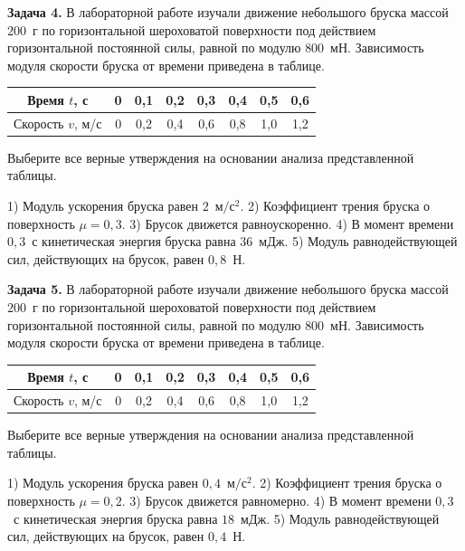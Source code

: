 \begin{taskbasic}[code={\label{task:newton2_v3_n5}}]
\textbf{Задача 4.} В лабораторной работе изучали движение небольшого бруска массой $200$~г по горизонтальной шероховатой поверхности под действием горизонтальной постоянной силы, равной по модулю $800$~мН. Зависимость модуля скорости бруска от времени приведена в таблице.
\begin{center}
\begin{tabular}{|c|c|c|c|c|c|c|c|}
\hline
Время $t$, с & 0 & 0,1 & 0,2 & 0,3 & 0,4 & 0,5 & 0,6 \\ \hline
Скорость $v$, м/с & 0 & 0,2 & 0,4 & 0,6 & 0,8 & 1,0 & 1,2 \\ \hline
\end{tabular}
\end{center}
Выберите все верные утверждения на основании анализа представленной таблицы.

1) Модуль ускорения бруска равен $2$~$м/с^2$.
2) Коэффициент трения бруска о поверхность $\mu = 0{,}3$.
3) Брусок движется равноускоренно.
4) В момент времени $0{,}3$~с кинетическая энергия бруска равна $36$~мДж.
5) Модуль равнодействующей сил, действующих на брусок, равен $0{,}8$~Н.

\end{taskbasic}

\begin{taskbasic}[code={\label{task:newton2_v4_n5}}]
\textbf{Задача 5.} В лабораторной работе изучали движение небольшого бруска массой $200$~г по горизонтальной шероховатой поверхности под действием горизонтальной постоянной силы, равной по модулю $800$~мН. Зависимость модуля скорости бруска от времени приведена в таблице.
\begin{center}
\begin{tabular}{|c|c|c|c|c|c|c|c|}
\hline
Время $t$, с & 0 & 0,1 & 0,2 & 0,3 & 0,4 & 0,5 & 0,6 \\ \hline
Скорость $v$, м/с & 0 & 0,2 & 0,4 & 0,6 & 0,8 & 1,0 & 1,2 \\ \hline
\end{tabular}
\end{center}
Выберите все верные утверждения на основании анализа представленной таблицы.

1) Модуль ускорения бруска равен $0{,}4$~$м/с^2$.
2) Коэффициент трения бруска о поверхность $\mu = 0{,}2$.
3) Брусок движется равномерно.
4) В момент времени $0{,}3$~с кинетическая энергия бруска равна $18$~мДж.
5) Модуль равнодействующей сил, действующих на брусок, равен $0{,}4$~Н.

\end{taskbasic}

